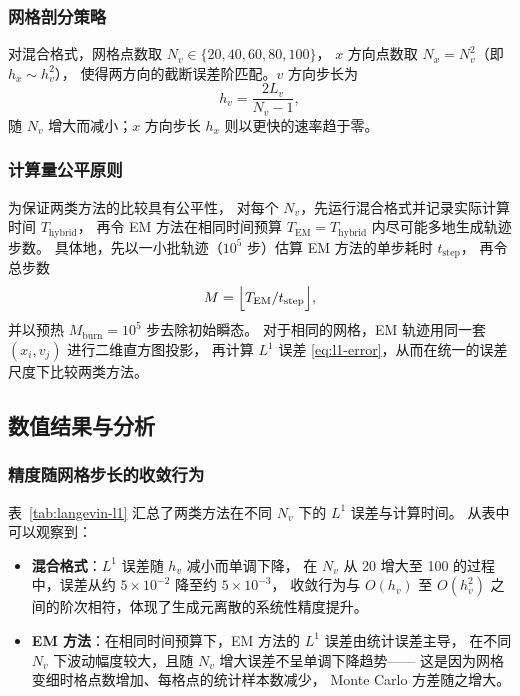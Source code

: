 	\subsubsection{网格剖分策略}
	
	对混合格式，网格点数取 $N_v \in \{20, 40, 60, 80, 100\}$，
	$x$ 方向点数取 $N_x = N_v^2$（即 $h_x \sim h_v^2$），
	使得两方向的截断误差阶匹配。$v$ 方向步长为
	\[
	h_v = \frac{2L_v}{N_v - 1},
	\]
	随 $N_v$ 增大而减小；$x$ 方向步长 $h_x$ 则以更快的速率趋于零。
	
	\subsubsection{计算量公平原则}
	
	为保证两类方法的比较具有公平性，
	对每个 $N_v$，先运行混合格式并记录实际计算时间 $T_{\mathrm{hybrid}}$，
	再令 EM 方法在相同时间预算 $T_{\mathrm{EM}} = T_{\mathrm{hybrid}}$ 内尽可能多地生成轨迹步数。
	具体地，先以一小批轨迹（$10^5$ 步）估算 EM 方法的单步耗时 $t_{\mathrm{step}}$，
	再令总步数
	\[
	M = \Bigl\lfloor T_{\mathrm{EM}} / t_{\mathrm{step}} \Bigr\rfloor,
	\]
	并以预热 $M_{\mathrm{burn}} = 10^5$ 步去除初始瞬态。
	对于相同的网格，EM 轨迹用同一套 $(x_i, v_j)$ 进行二维直方图投影，
	再计算 $L^1$ 误差 \eqref{eq:l1-error}，从而在统一的误差尺度下比较两类方法。
	
	\subsection{数值结果与分析}
	
	\subsubsection{精度随网格步长的收敛行为}
	
	表~\ref{tab:langevin-l1} 汇总了两类方法在不同 $N_v$ 下的 $L^1$ 误差与计算时间。
	从表中可以观察到：
	
	\begin{itemize}
		\item \textbf{混合格式}：$L^1$ 误差随 $h_v$ 减小而单调下降，
		在 $N_v$ 从 20 增大至 100 的过程中，误差从约 $5\times10^{-2}$ 降至约 $5\times10^{-3}$，
		收敛行为与 $O(h_v)$ 至 $O(h_v^2)$ 之间的阶次相符，体现了生成元离散的系统性精度提升。
		\item \textbf{EM 方法}：在相同时间预算下，EM 方法的 $L^1$ 误差由统计误差主导，
		在不同 $N_v$ 下波动幅度较大，且随 $N_v$ 增大误差不呈单调下降趋势——
		这是因为网格变细时格点数增加、每格点的统计样本数减少，
		Monte Carlo 方差随之增大。
	\end{itemize}
	
